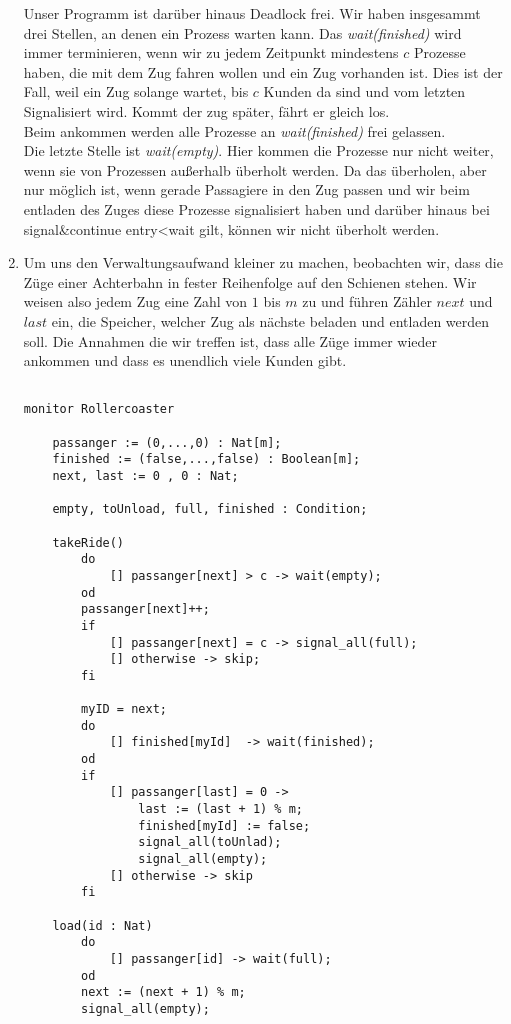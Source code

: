 \documentclass[ngerman,a4paper,11pt]{article}
\begin{document}
\begin{enumerate}[1.]
	Unser Programm ist darüber hinaus Deadlock frei. Wir haben insgesammt drei Stellen, an denen ein Prozess warten kann.
	Das \emph{wait(finished)} wird immer terminieren, wenn wir zu jedem Zeitpunkt mindestens $c$ Prozesse haben, die mit
	dem Zug fahren wollen und ein Zug vorhanden ist. Dies ist der Fall, weil ein Zug solange wartet, bis $c$ Kunden da sind
	und vom letzten Signalisiert wird. Kommt der zug später, fährt er gleich los.\\
	Beim ankommen werden alle Prozesse an \emph{wait(finished)} frei gelassen.\\

	Die letzte Stelle ist \emph{wait(empty)}. Hier kommen die Prozesse nur nicht weiter, wenn sie von Prozessen außerhalb
	überholt werden. Da das überholen, aber nur möglich ist, wenn gerade Passagiere in den Zug passen
	und wir beim entladen des Zuges diese Prozesse signalisiert haben und darüber hinaus bei signal\&continue 
	entry<wait gilt, können wir nicht überholt werden.

	\item

Um uns den Verwaltungsaufwand kleiner zu machen, beobachten wir, dass die Züge einer Achterbahn in fester Reihenfolge auf den Schienen
stehen. Wir weisen also jedem Zug eine Zahl von $1$ bis $m$ zu und führen Zähler $next$ und $last$ ein, die Speicher, welcher
Zug als nächste beladen und entladen werden soll. Die Annahmen die wir treffen ist, dass alle Züge immer wieder ankommen und
dass es unendlich viele Kunden gibt.

	\begin{lstlisting}

monitor Rollercoaster

	passanger := (0,...,0) : Nat[m];
	finished := (false,...,false) : Boolean[m];
	next, last := 0 , 0 : Nat;

	empty, toUnload, full, finished : Condition;

	takeRide()
		do
			[] passanger[next] > c -> wait(empty);
		od
		passanger[next]++;
		if
			[] passanger[next] = c -> signal_all(full);
			[] otherwise -> skip;
		fi

		myID = next;
		do
			[] finished[myId]  -> wait(finished);
		od
		if
			[] passanger[last] = 0 -> 
				last := (last + 1) % m;
				finished[myId] := false;
				signal_all(toUnlad);
				signal_all(empty);
			[] otherwise -> skip
		fi

	load(id : Nat)
		do
			[] passanger[id] -> wait(full);
		od
		next := (next + 1) % m;
		signal_all(empty);
		

\end{lstlisting}
\end{enumerate}
\end{document}
